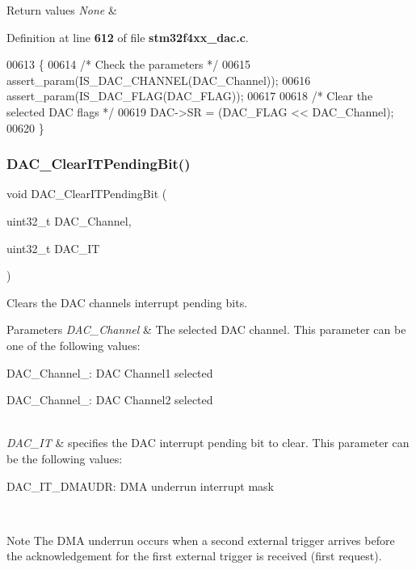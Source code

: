 \begin{DoxyRetVals}{Return values}
{\em None} & \\
\hline
\end{DoxyRetVals}


Definition at line \textbf{ 612} of file \textbf{ stm32f4xx\+\_\+dac.\+c}.


\begin{DoxyCode}
00613 \{
00614   \textcolor{comment}{/* Check the parameters */}
00615   assert_param(IS_DAC_CHANNEL(DAC\_Channel));
00616   assert_param(IS_DAC_FLAG(DAC\_FLAG));
00617 
00618   \textcolor{comment}{/* Clear the selected DAC flags */}
00619   DAC->SR = (DAC\_FLAG << DAC\_Channel);
00620 \}
\end{DoxyCode}
\mbox{\label{group__DAC__Group3_ga12d90e69a2642997136b23224d180641}} 
\subsubsection{D\+A\+C\+\_\+\+Clear\+I\+T\+Pending\+Bit()}
{\footnotesize\ttfamily void D\+A\+C\+\_\+\+Clear\+I\+T\+Pending\+Bit (\begin{DoxyParamCaption}\item[{uint32\+\_\+t}]{D\+A\+C\+\_\+\+Channel,  }\item[{uint32\+\_\+t}]{D\+A\+C\+\_\+\+IT }\end{DoxyParamCaption})}



Clears the D\+AC channel\textquotesingle{}s interrupt pending bits. 


\begin{DoxyParams}{Parameters}
{\em D\+A\+C\+\_\+\+Channel} & The selected D\+AC channel. This parameter can be one of the following values\+: \begin{DoxyItemize}
\item D\+A\+C\+\_\+\+Channel\+\_\+: D\+AC Channel1 selected \item D\+A\+C\+\_\+\+Channel\+\_\+: D\+AC Channel2 selected \end{DoxyItemize}
\\
\hline
{\em D\+A\+C\+\_\+\+IT} & specifies the D\+AC interrupt pending bit to clear. This parameter can be the following values\+: \begin{DoxyItemize}
\item D\+A\+C\+\_\+\+I\+T\+\_\+\+D\+M\+A\+U\+DR\+: D\+MA underrun interrupt mask \end{DoxyItemize}
\\
\hline
\end{DoxyParams}
\begin{DoxyNote}{Note}
The D\+MA underrun occurs when a second external trigger arrives before the acknowledgement for the first external trigger is received (first request). 
\end{DoxyNote}

